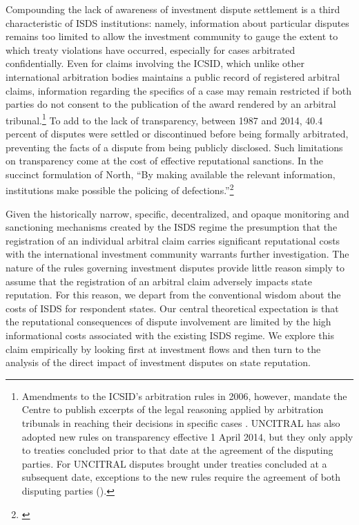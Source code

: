 \documentclass[12pt,onesided]{amsart}
\begin{document}
Compounding the lack of awareness of investment dispute settlement is a third characteristic of ISDS institutions: namely, information about particular disputes remains too limited to allow the investment community to gauge the extent to which treaty violations have occurred, especially for cases arbitrated confidentially. Even for claims involving the ICSID, which unlike other international arbitration bodies maintains a public record of registered arbitral claims, information regarding the specifics of a case may remain restricted if both parties do not consent to the publication of the award rendered by an arbitral tribunal.\footnote{Amendments to the ICSID's arbitration rules in 2006, however, mandate the Centre to publish excerpts of the legal reasoning applied by arbitration tribunals in reaching their decisions in specific cases \citep{antonietti:2006}. UNCITRAL has also adopted new rules on transparency effective 1 April 2014, but they only apply to treaties concluded prior to that date at the agreement of the disputing parties. For UNCITRAL disputes brought under treaties concluded at a subsequent date, exceptions to the new rules require the agreement of both disputing parties (\citealp[p. 33--40]{uncitral:2013}).} To add to the lack of transparency, between 1987 and 2014, 40.4 percent of disputes were settled or discontinued before being formally arbitrated, preventing the facts of a dispute from being publicly disclosed. Such limitations on transparency come at the cost of effective reputational sanctions. In the succinct formulation of North, ``By making available the relevant information, institutions make possible the policing of defections.''\footnote{\citet[p. 57]{north1990institutions}} 

Given the historically narrow, specific, decentralized, and opaque monitoring and sanctioning mechanisms created by the ISDS regime the presumption that the registration of an individual arbitral claim carries significant reputational costs with the international investment community warrants further investigation. The nature of the rules governing investment disputes provide little reason simply to assume that the registration of an arbitral claim adversely impacts state reputation. For this reason, we depart from the conventional wisdom about the costs of ISDS for respondent states. Our central theoretical expectation is that the reputational consequences of dispute involvement are limited by the high informational costs associated with the existing ISDS regime. We explore this claim empirically by looking first at investment flows and then turn to the analysis of the direct impact of investment disputes on state reputation. 
\end{document}
